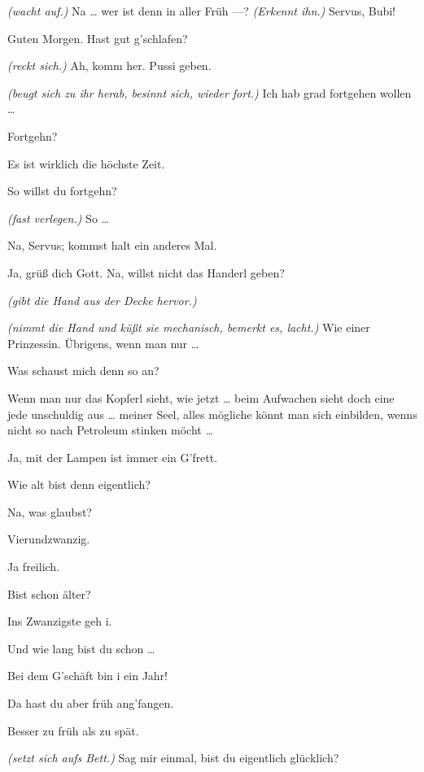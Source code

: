 \documentclass[
	final,
	a4paper,
	ngerman,
	mpinclude = true, %
	twoside = true,
	open = right,
	cleardoublepage = plain,
	DIV = 13,
	BCOR = 1cm,
	titlepage = firstiscover,
	]{scrbook}
\newcommand{\direction}[1]{\textit{(#1)}}
\newcommand{\thecharacter}[1]{\textup{\textsc{#1}}\xspace}
\newcommand{\thedirne}{\thecharacter{Nutte}}
\newcommand{\thegraf}{\thecharacter{Entrepeneurin}}
\newcommand{\character}[1]{\item[#1:]}
\newcommand{\dirne}{\character{\thedirne}}
\newcommand{\entrepeneurin}{\character{\thegraf}}
\begin{document}
\begin{play}
	\dirne
	\direction{wacht auf.} Na \ldots{} wer ist denn in aller Früh ---? \direction{Erkennt ihn.} Servus, Bubi!

	\entrepeneurin
	Guten Morgen. Hast gut g'schlafen?

	\dirne
	\direction{reckt sich.} Ah, komm her. Pussi geben.

	\entrepeneurin
	\direction{beugt sich zu ihr herab, besinnt sich, wieder fort.} Ich hab grad fortgehen wollen \ldots{}

	\dirne
	Fortgehn?

	\entrepeneurin
	Es ist wirklich die höchste Zeit.

	\dirne
	So willst du fortgehn?

	\entrepeneurin
	\direction{fast verlegen.} So \ldots{}

	\dirne
	Na, Servus; kommst halt ein anderes Mal.

	\entrepeneurin
	Ja, grüß dich Gott. Na, willst nicht das Handerl geben?

	\dirne
	\direction{gibt die Hand aus der Decke hervor.}

	\entrepeneurin
	\direction{nimmt die Hand und küßt sie mechanisch, bemerkt es, lacht.} Wie einer Prinzessin. Übrigens, wenn man nur \ldots{}

	\dirne
	Was schaust mich denn so an?

	\entrepeneurin
	Wenn man nur das Kopferl sieht, wie jetzt \ldots{} beim Aufwachen sieht doch eine jede unschuldig aus \ldots{} meiner Seel, alles mögliche könnt man sich einbilden, wenns nicht so nach Petroleum stinken möcht \ldots{}

	\dirne
	Ja, mit der Lampen ist immer ein G'frett.

	\entrepeneurin
	Wie alt bist denn eigentlich?

	\dirne
	Na, was glaubst?

	\entrepeneurin
	Vierundzwanzig.

	\dirne
	Ja freilich.

	\entrepeneurin
	Bist schon älter?

	\dirne
	Ins Zwanzigste geh i.

	\entrepeneurin
	Und wie lang bist du schon \ldots{}

	\dirne
	Bei dem G'schäft bin i ein Jahr!

	\entrepeneurin
	Da hast du aber früh ang'fangen.

	\dirne
	Besser zu früh als zu spät.

	\entrepeneurin
	\direction{setzt sich aufs Bett.} Sag mir einmal, bist du eigentlich glücklich?


\end{play}
\end{document}
